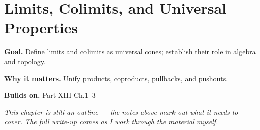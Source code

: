\chapter{Limits, Colimits, and Universal Properties}
\label{ch:13-category-theory-and-universal-structures-04}

\begin{chapterintro}
\textbf{Goal.} Define limits and colimits as universal cones; establish their role in algebra and topology.

\textbf{Why it matters.} Unify products, coproducts, pullbacks, and pushouts.

\textbf{Builds on.} Part XIII Ch.1–3
\end{chapterintro}

\textit{This chapter is still an outline --- the notes above mark out what it needs to cover. The full write-up comes as I work through the material myself.}
